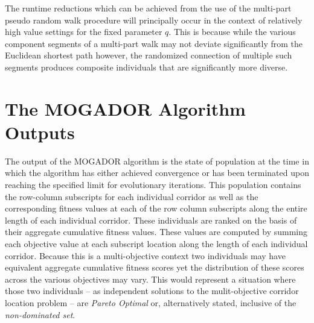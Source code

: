 The runtime reductions which can be achieved from the use of the multi-part pseudo random walk procedure will principally occur in the context of relatively high value settings for the fixed parameter $q$. This is because while the various component segments of a multi-part walk may not deviate significantly from the Euclidean shortest path however, the randomized connection of multiple such segments produces composite individuals that are significantly more diverse.
            
\section{The MOGADOR Algorithm Outputs}

The output of the MOGADOR algorithm is the state of population at the time in which the algorithm has either achieved convergence or has been terminated upon reaching the specified limit for evolutionary iterations. This population contains the row-column subscripts for each individual corridor as well as the corresponding fitness values at each of the row column subscripts along the entire length of each individual corridor. These individuals are ranked on the basis of their aggregate cumulative fitness values. These values are computed by summing each objective value at each subscript location along the length of each individual corridor. Because this is a multi-objective context two individuals may have equivalent aggregate cumulative fitness scores yet the distribution of these scores across the various objectives may vary. This would represent a situation where those two individuals -- as independent solutions to the mulit-objective corridor location problem -- are \textit{Pareto Optimal} or, alternatively stated, inclusive of the \textit{non-dominated set}.

\clearpage
